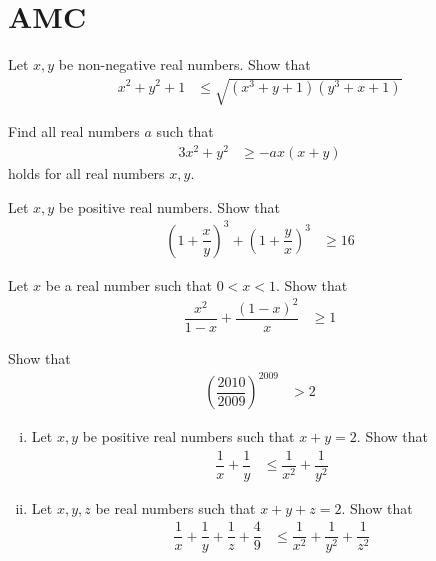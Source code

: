 \documentclass{subfile}
\begin{document}
	\section{AMC}\label{sec:amc}
		\begin{problem}
			Let $x,y$ be non-negative real numbers. Show that
				\begin{align*}
					x^{2}+y^{2}+1
						& \leq \sqrt{(x^{3}+y+1)(y^{3}+x+1)}
				\end{align*}
		\end{problem}
	
		\begin{problem}
			Find all real numbers $a$ such that
				\begin{align*}
					3x^{2}+y^{2}
						& \geq -ax(x+y)
				\end{align*}
			holds for all real numbers $x,y$.
		\end{problem}
	
		\begin{problem}
			Let $x,y$ be positive real numbers. Show that
				\begin{align*}
					\left(1+\dfrac{x}{y}\right)^{3}+\left(1+\dfrac{y}{x}\right)^{3}
						& \geq 16
				\end{align*}
		\end{problem}
	
		\begin{problem}
			Let $x$ be a real number such that $0<x<1$. Show that
				\begin{align*}
					\dfrac{x^{2}}{1-x}+\dfrac{(1-x)^{2}}{x}
						& \geq1
				\end{align*}
		\end{problem}
	
		\begin{problem}
			Show that
				\begin{align*}
					\left(\dfrac{2010}{2009}\right)^{2009}
						& > 2
				\end{align*}
		\end{problem}
	
		\begin{problem}
			\begin{enumerate}[(i)]
				\item Let $x,y$ be positive real numbers such that $x+y=2$. Show that
					\begin{align*}
						\dfrac{1}{x}+\dfrac{1}{y}
							& \leq\dfrac{1}{x^{2}}+\dfrac{1}{y^{2}}
					\end{align*}
				\item Let $x,y,z$ be real numbers such that $x+y+z=2$. Show that
					\begin{align*}
						\dfrac{1}{x}+\dfrac{1}{y}+\dfrac{1}{z}+\dfrac{4}{9}
							& \leq \dfrac{1}{x^{2}}+\dfrac{1}{y^{2}}+\dfrac{1}{z^{2}}
					\end{align*}
			\end{enumerate}
		\end{problem}
	
\end{document}
